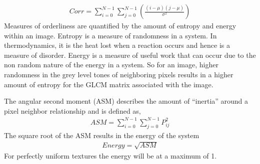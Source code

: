 \begin{align}
    Corr = \sum_{i=0}^{N-1}\sum_{j=0}^{N-1}(\frac{(i-\mu)(j-\mu)}{\sigma^2})
\end{align}
%
Measures of orderliness are quantified by the amount of entropy and energy within an image.  Entropy is a measure of randomness in a system.  In thermodynamics, it is the heat lost when a reaction occurs and hence is a measure of disorder.  Energy is a measure of useful work that can occur due to the non random nature of the energy in a system.  So for an image, higher randomness in the grey level tones of neighboring pixels results in a higher amount of entropy for the GLCM matrix associated with the image.

The angular second moment (ASM) describes the amount of “inertia” around a pixel neighbor relationship and is defined as,
%
\begin{align}
    ASM = \sum_{i=0}^{N-1}\sum_{j=0}^{N-1}P_{ij}^2
\end{align}
%
The square root of the ASM results in the energy of the system
%
\begin{align}
    Energy = \sqrt{ASM}
\end{align}
%
For perfectly uniform textures the energy will be at a maximum of 1.

